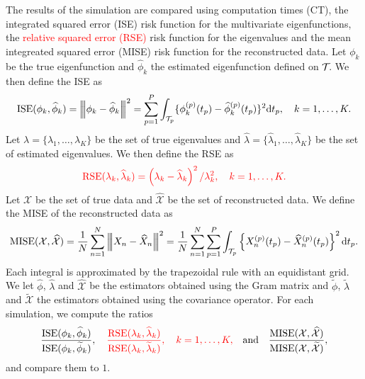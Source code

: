 The results of the simulation are compared using computation times (CT), the integrated squared error (ISE) risk function for the multivariate eigenfunctions, the \textcolor{red}{relative squared error (RSE)} risk function for the eigenvalues and the mean integreated squared error (MISE) risk function for the reconstructed data. Let $\phi_k$ be the true eigenfunction and $\widehat{\phi}_k$ the estimated eigenfunction defined on $\mathcal{T}_{}$. We then define the ISE as 
\begin{equation}\label{eq:ise_eigenfunctions}
    \text{ISE}(\phi_k, \widehat{\phi}_k) = \left|\!\left|\!\left|\phi_k - \widehat{\phi}_k\right|\!\right|\!\right|^2 = \sum_{p = 1}^P \int_{\mathcal{T}_{p}} \{\phi^{(p)}_k(t_p) - \widehat{\phi}^{(p)}_k(t_p)\}^2 {\rm d} t_p, \quad k = 1, \dots, K.
\end{equation}
Let $\lambda = \{\lambda_1, \dots, \lambda_K\}$ be the set of true eigenvalues and $\widehat{\lambda} = \{\widehat{\lambda}_1, \dots, \widehat{\lambda}_K\}$ be the set of estimated eigenvalues. We then define the RSE as 
\begin{equation}\label{eq:mse_eigenvalues}
    \textcolor{red}{\text{RSE}(\lambda_k, \widehat{\lambda}_k) = \left(\lambda_k - \widehat{\lambda}_k\right)^2 / \lambda_k^2, \quad k = 1, \dots, K.}
\end{equation}
Let $\mathcal{X}$ be the set of true data and $\widehat{\mathcal{X}}$ be the set of reconstructed data. We define the MISE of the reconstructed data as
\begin{equation}\label{eq:mise_reconstructed_data}
    \text{MISE}(\mathcal{X}, \widehat{\mathcal{X}}) = \frac{1}{N}\sum_{n = 1}^N \left|\!\left|\!\left|X_n - \widehat{X}_n\right|\!\right|\!\right|^2 = \frac{1}{N}\sum_{n = 1}^N \sum_{p = 1}^P \int_{\mathcal{T}_{p}} \left\{X_n^{(p)}(t_p) - \widehat{X}_n^{(p)}(t_p) \right\}^2 {\rm d} t_p.
\end{equation}
Each integral is approximated by the trapezoidal rule with an equidistant grid. We let $\widehat{\phi}$, $\widehat{\lambda}$ and $\widehat{\mathcal{X}}$ be the estimators obtained using the Gram matrix and $\widetilde{\phi}$, $\widetilde{\lambda}$ and $\widetilde{\mathcal{X}}$ the estimators obtained using the covariance operator. For each simulation, we compute the ratios
\begin{equation}
    \frac{\text{ISE}(\phi_k, \widehat{\phi}_k)}{\text{ISE}(\phi_k, \widetilde{\phi}_k)}, \quad \textcolor{red}{\frac{\text{RSE}(\lambda_k, \widehat{\lambda}_k)}{\text{RSE}(\lambda_k, \widetilde{\lambda}_k)},\quad k = 1, \dots, K,} \quad\text{and}\quad \frac{\text{MISE}(\mathcal{X}, \widehat{\mathcal{X}})}{\text{MISE}(\mathcal{X}, \widetilde{\mathcal{X}})},
\end{equation}
and compare them to $1$.

